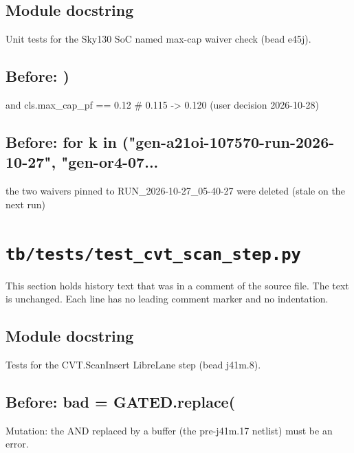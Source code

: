 \begin{record}

\subsection*{Module docstring}

\begin{textblock}
Unit tests for the Sky130 SoC named max-cap waiver check (bead e45j).
\end{textblock}

\subsection*{Before: )}

\begin{textblock}
and cls.max_cap_pf == 0.12  # 0.115 -> 0.120 (user decision 2026-10-28)
\end{textblock}

\subsection*{Before: for k in ("gen-a21oi-107570-run-2026-10-27", "gen-or4-07...}

\begin{textblock}
the two waivers pinned to RUN_2026-10-27_05-40-27 were deleted (stale on the next run)
\end{textblock}

\end{record}

\section{\texttt{tb/tests/test\_cvt\_scan\_step.py}}\label{cr:suite:test-cvt-scan-step}

This section holds history text that was in a comment of the source file. The text is unchanged. Each line has no leading comment marker and no indentation.

\begin{record}

\subsection*{Module docstring}

\begin{textblock}
Tests for the CVT.ScanInsert LibreLane step (bead j41m.8).
\end{textblock}

\subsection*{Before: bad = GATED.replace(}

\begin{textblock}
Mutation: the AND replaced by a buffer (the pre-j41m.17 netlist) must be an error.
\end{textblock}

\end{record}

